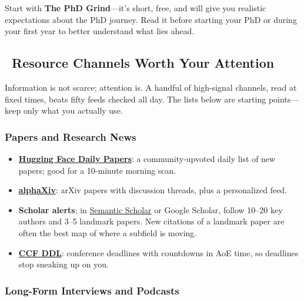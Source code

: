 \documentclass[11pt,a4paper]{article}
\begin{document}
\begin{tcolorbox}[colback=yellow!10,colframe=red!50,title=Reading Recommendation]
Start with \textbf{The PhD Grind}—it's short, free, and will give you realistic expectations about the PhD journey. Read it before starting your PhD or during your first year to better understand what lies ahead.
\end{tcolorbox}

\subsection{\faRss~Resource Channels Worth Your Attention}\label{sec:resources}

\begin{tcolorbox}[colback=blue!5,colframe=darkblue,title={Attention Is the Scarce Resource}]
Information is not scarce; attention is. A handful of high-signal channels, read at fixed times, beats fifty feeds checked all day. The lists below are starting points---keep only what you actually use.
\end{tcolorbox}

\subsubsection{Papers and Research News}

\begin{itemize}
    \item \textbf{\href{https://huggingface.co/papers}{Hugging Face Daily Papers}}: a community-upvoted daily list of new papers; good for a 10-minute morning scan.
    \item \textbf{\href{https://www.alphaxiv.org/}{alphaXiv}}: arXiv papers with discussion threads, plus a personalized feed.
    \item \textbf{Scholar alerts}: in \href{https://www.semanticscholar.org/}{Semantic Scholar} or Google Scholar, follow 10--20 key authors and 3--5 landmark papers. New citations of a landmark paper are often the best map of where a subfield is moving.
    \item \textbf{\href{https://ccfddl.com/}{CCF DDL}}: conference deadlines with countdowns in AoE time, so deadlines stop sneaking up on you.
\end{itemize}

\subsubsection{Long-Form Interviews and Podcasts}
\end{document}
